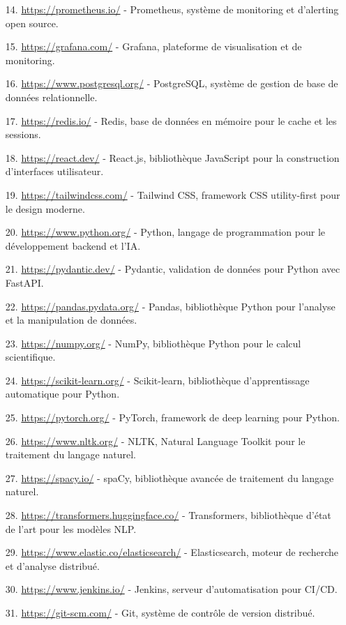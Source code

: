 \begin{itemize}[leftmargin=1cm, itemsep=0.3em, parsep=0.2em]
    \item[14.] \url{https://prometheus.io/} - Prometheus, système de monitoring et d'alerting open source.
    \item[15.] \url{https://grafana.com/} - Grafana, plateforme de visualisation et de monitoring.
    \item[16.] \url{https://www.postgresql.org/} - PostgreSQL, système de gestion de base de données relationnelle.
    \item[17.] \url{https://redis.io/} - Redis, base de données en mémoire pour le cache et les sessions.
    \item[18.] \url{https://react.dev/} - React.js, bibliothèque JavaScript pour la construction d'interfaces utilisateur.
    \item[19.] \url{https://tailwindcss.com/} - Tailwind CSS, framework CSS utility-first pour le design moderne.
    \item[20.] \url{https://www.python.org/} - Python, langage de programmation pour le développement backend et l'IA.
    \item[21.] \url{https://pydantic.dev/} - Pydantic, validation de données pour Python avec FastAPI.
    \item[22.] \url{https://pandas.pydata.org/} - Pandas, bibliothèque Python pour l'analyse et la manipulation de données.
    \item[23.] \url{https://numpy.org/} - NumPy, bibliothèque Python pour le calcul scientifique.
    \item[24.] \url{https://scikit-learn.org/} - Scikit-learn, bibliothèque d'apprentissage automatique pour Python.
    \item[25.] \url{https://pytorch.org/} - PyTorch, framework de deep learning pour Python.
    \item[26.] \url{https://www.nltk.org/} - NLTK, Natural Language Toolkit pour le traitement du langage naturel.
    \item[27.] \url{https://spacy.io/} - spaCy, bibliothèque avancée de traitement du langage naturel.
    \item[28.] \url{https://transformers.huggingface.co/} - Transformers, bibliothèque d'état de l'art pour les modèles NLP.
    \item[29.] \url{https://www.elastic.co/elasticsearch/} - Elasticsearch, moteur de recherche et d'analyse distribué.
    \item[30.] \url{https://www.jenkins.io/} - Jenkins, serveur d'automatisation pour CI/CD.
    \item[31.] \url{https://git-scm.com/} - Git, système de contrôle de version distribué.

\end{itemize}
